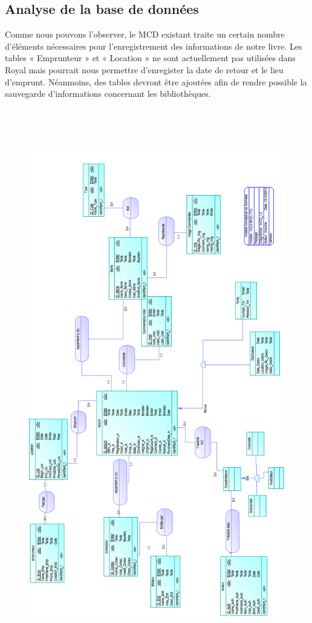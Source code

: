 \subsection{Analyse de la base de données}

Comme nous pouvons l'observer, le MCD existant traite un certain nombre d'éléments nécessaires pour l'enregistrement des informations de notre livre.
Les tables « Emprunteur » et « Location » ne sont actuellement pas utilisées dans Royal mais pourrait nous permettre d'enregister la date de retour et le lieu d'emprunt.
Néanmoins, des tables devront être ajoutées afin de rendre possible la sauvegarde d'informations concernant les bibliothèques.


\begin{figure}[hp]
 \centering
 \includegraphics[height=24cm]{../img/MCD_Royal.png}
\end{figure}

